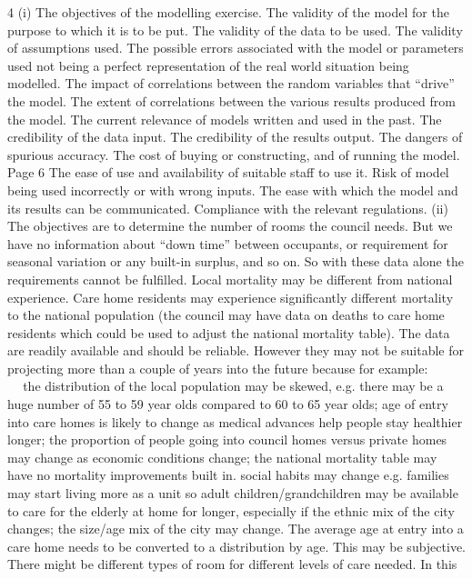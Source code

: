 \documentclass[a4paper,12pt]{article}
\begin{document}
\begin{enumerate}
4
(i)
The objectives of the modelling exercise.
The validity of the model for the purpose to which it is to be put.
The validity of the data to be used.
The validity of assumptions used.
The possible errors associated with the model or parameters used not being a perfect
representation of the real world situation being modelled.
The impact of correlations between the random variables that “drive” the model.
The extent of correlations between the various results produced from the model.
The current relevance of models written and used in the past.
The credibility of the data input.
The credibility of the results output.
The dangers of spurious accuracy.
The cost of buying or constructing, and of running the model.
Page 6%
The ease of use and availability of suitable staff to use it.
Risk of model being used incorrectly or with wrong inputs.
The ease with which the model and its results can be communicated.
Compliance with the relevant regulations.
(ii)
The objectives are to determine the number of rooms the council needs.
But we have no information about “down time” between occupants, or
requirement for seasonal variation or any built-in surplus, and so on.
So with these data alone the requirements cannot be fulfilled.
Local mortality may be different from national experience.
Care home residents may experience significantly different mortality to the
national population (the council may have data on deaths to care home residents
which could be used to adjust the national mortality table).
The data are readily available and should be reliable.
However they may not be suitable for projecting more than a couple of years into the
future because for example:






the distribution of the local population may be skewed, e.g. there may be a huge
number of 55 to 59 year olds compared to 60 to 65 year olds;
age of entry into care homes is likely to change as medical advances help people
stay healthier longer;
the proportion of people going into council homes versus private homes may
change as economic conditions change;
the national mortality table may have no mortality improvements built in.
social habits may change e.g. families may start living more as a unit so adult
children/grandchildren may be available to care for the elderly at home for longer,
especially if the ethnic mix of the city changes;
the size/age mix of the city may change.
The average age at entry into a care home needs to be converted to a distribution by
age. This may be subjective.
There might be different types of room for different levels of care needed. In this

\end{enumerate}
\end{document}
